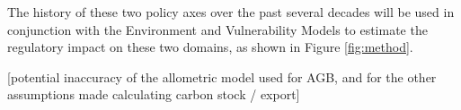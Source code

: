 The history of these two policy axes over the past several decades will be used in conjunction with the Environment and Vulnerability Models to estimate the regulatory impact on these two domains, as shown in Figure \ref{fig:method}.

[potential inaccuracy of the allometric model used for AGB, and for the other assumptions made calculating carbon stock / export]

\section{}






